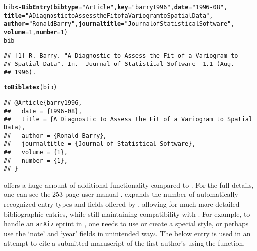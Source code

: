 \documentclass[article]{jss}\usepackage[]{graphicx}\usepackage[]{color}
\makeatletter
\newcommand{\hlnum}[1]{\textcolor[rgb]{0.125,0.125,1}{#1}}%
\newcommand{\hlstr}[1]{\textcolor[rgb]{0.125,0.125,1}{#1}}%
\newcommand{\hlstd}[1]{\textcolor[rgb]{0.251,0.251,0.282}{#1}}%
\newcommand{\hlkwb}[1]{\textcolor[rgb]{0.439,0.251,1}{\textbf{#1}}}%
\newcommand{\hlkwc}[1]{\textcolor[rgb]{0.529,0,0.184}{\textbf{#1}}}%
\newcommand{\hlkwd}[1]{\textcolor[rgb]{0.251,0.251,0.282}{\textbf{#1}}}%
\newenvironment{kframe}{%
 \def\at@end@of@kframe{}%
 \ifinner\ifhmode%
  \def\at@end@of@kframe{\end{minipage}}%
  \begin{minipage}{\columnwidth}%
 \fi\fi%
 \def\FrameCommand##1{\hskip\@totalleftmargin \hskip-\fboxsep
 \colorbox{shadecolor}{##1}\hskip-\fboxsep
     \hskip-\linewidth \hskip-\@totalleftmargin \hskip\columnwidth}%
 \MakeFramed {\advance\hsize-\width
   \@totalleftmargin\z@ \linewidth\hsize
   \@setminipage}}%
 {\par\unskip\endMakeFramed%
 \at@end@of@kframe}
\newenvironment{knitrout}{}{} %
\makeatother
\begin{document}
\begin{knitrout}
\color{fgcolor}\begin{kframe}
\begin{alltt}
\hlstd{bib} \hlkwb{<-} \hlkwd{BibEntry}\hlstd{(}\hlkwc{bibtype}\hlstd{=}\hlstr{"Article"}\hlstd{,} \hlkwc{key} \hlstd{=} \hlstr{"barry1996"}\hlstd{,} \hlkwc{date} \hlstd{=} \hlstr{"1996-08"}\hlstd{,}
  \hlkwc{title} \hlstd{=} \hlstr{"A Diagnostic to Assess the Fit of a Variogram to Spatial Data"}\hlstd{,}
  \hlkwc{author} \hlstd{=} \hlstr{"Ronald Barry"}\hlstd{,} \hlkwc{journaltitle} \hlstd{=} \hlstr{"Journal of Statistical Software"}\hlstd{,}
                 \hlkwc{volume} \hlstd{=} \hlnum{1}\hlstd{,} \hlkwc{number} \hlstd{=} \hlnum{1}\hlstd{)}
\hlstd{bib}
\end{alltt}
\begin{verbatim}
## [1] R. Barry. "A Diagnostic to Assess the Fit of a Variogram to
## Spatial Data". In: _Journal of Statistical Software_ 1.1 (Aug.
## 1996).
\end{verbatim}
\begin{alltt}
\hlkwd{toBiblatex}\hlstd{(bib)}
\end{alltt}
\begin{verbatim}
## @Article{barry1996,
##   date = {1996-08},
##   title = {A Diagnostic to Assess the Fit of a Variogram to Spatial Data},
##   author = {Ronald Barry},
##   journaltitle = {Journal of Statistical Software},
##   volume = {1},
##   number = {1},
## }
\end{verbatim}
\end{kframe}
\end{knitrout}


\Biblatex{} offers a huge amount of additional functionality compared to \Bibtex{}.  For the full details, one can see the 253 page user manual \citep{biblatex}.  \Biblatex{} expands the number of automatically recognized entry types and fields offered by \Bibtex{}, allowing for much more detailed bibliographic entries,  while still maintaining compatibility with \Bibtex{}.  For example, to handle an \texttt{arXiv} eprint in \Bibtex{}, one needs to use or create a special \Bibtex{} style, or perhaps use the `note' and `year' fields in unintended ways.  The below entry is used in an attempt to cite a submitted manuscript of the first author's using the  function. 
\end{document}

